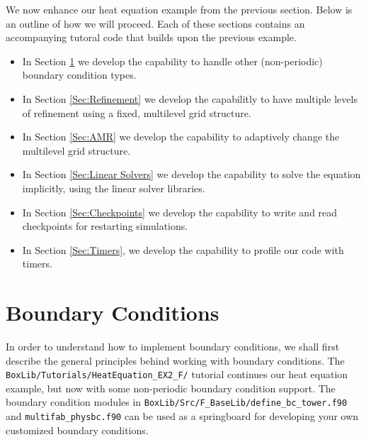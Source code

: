 We now enhance our heat equation example from the previous section.
Below is an outline of how we will proceed.  Each of these sections contains an 
accompanying tutoral code that builds upon the previous example.
\begin{itemize}

\item In Section \ref{Sec:Boundary Conditions} we develop the capability to handle
other (non-periodic) boundary condition types.

\item In Section \ref{Sec:Refinement} we develop the capabilitly to have multiple
levels of refinement using a fixed, multilevel grid structure.

\item In Section \ref{Sec:AMR} we develop the capability to adaptively change the
multilevel grid structure.

\item In Section \ref{Sec:Linear Solvers} we develop the capability to solve the
equation implicitly, using the linear solver libraries.

\item In Section \ref{Sec:Checkpoints} we develop the capability to write and read
checkpoints for restarting simulations.

\item In Section \ref{Sec:Timers}, we develop the capability to profile our code
with timers.

\end{itemize}

\section{Boundary Conditions}\label{Sec:Boundary Conditions}
In order to understand how to implement boundary conditions, we shall 
first describe the general principles behind working with boundary conditions.
The {\tt BoxLib/Tutorials/HeatEquation\_EX2\_F/} tutorial continues our heat
equation example, but now with some non-periodic boundary condition support.  The boundary
condition modules in {\tt BoxLib/Src/F\_BaseLib/define\_bc\_tower.f90} and {\tt multifab\_physbc.f90} 
can be used as a springboard for developing your own customized boundary conditions.

